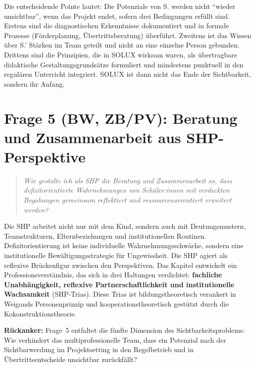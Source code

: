 \documentclass[ngerman, a4paper]{article}
\begin{document}
Die entscheidende Pointe lautet: Die Potenziale von S. werden nicht
\enquote{wieder unsichtbar}, wenn das Projekt endet, sofern drei Bedingungen
erfüllt sind. Erstens sind die diagnostischen Erkenntnisse dokumentiert und
in formale Prozesse (Förderplanung, Übertrittsberatung) überführt. Zweitens
ist das Wissen über S.' Stärken im Team geteilt und nicht an eine einzelne
Person gebunden. Drittens sind die Prinzipien, die in SOLUX wirksam waren,
als übertragbare didaktische Gestaltungsgrundsätze formuliert und mindestens
punktuell in den regulären Unterricht integriert. SOLUX ist dann nicht das
Ende der Sichtbarkeit, sondern ihr Anfang.

\newpage
\section{Frage 5 (BW, ZB/PV): Beratung und Zusammenarbeit aus SHP-Perspektive}
\label{sec:frage5}

\begin{quote}\itshape
  Wie gestalte ich als SHP die Beratung und Zusammenarbeit so,
  dass defizitorientierte
  Wahrnehmungen von Schüler:innen mit verdeckten Begabungen gemeinsam reflektiert
  und ressourcenorientiert erweitert werden?
\end{quote}

\begin{kapitelueberblick}
  Die SHP arbeitet nicht nur mit dem Kind, sondern auch mit Deutungsmustern,
  Teamstrukturen, Elternbeziehungen und institutionellen Routinen.
  Defizitorientierung ist keine individuelle Wahrnehmungsschwäche, sondern eine
  institutionelle Bewältigungsstrategie für Ungewissheit. Die SHP agiert als
  reflexive Brückenfigur zwischen den Perspektiven. Das Kapitel entwickelt ein
  Professionsverständnis, das sich in drei Haltungen verdichtet: \textbf{fachliche
    Unabhängigkeit, reflexive Partnerschaftlichkeit und institutionelle Wachsamkeit}
  (SHP-Trias). Diese Trias ist bildungstheoretisch verankert in Weigands
  Personenprinzip und kooperationstheoretisch gestützt durch die
  Kokonstruktionstheorie.

  \medskip\textbf{Rückanker:} Frage~5 entfaltet die fünfte Dimension des
  Sichtbarkeitsproblems: Wie verhindert das multiprofessionelle Team, dass ein
  Potenzial nach der Sichtbarwerdung im Projektsetting in den Regelbetrieb und in
  Übertrittsentscheide unsichtbar zurückfällt?
\end{kapitelueberblick}
\end{document}
